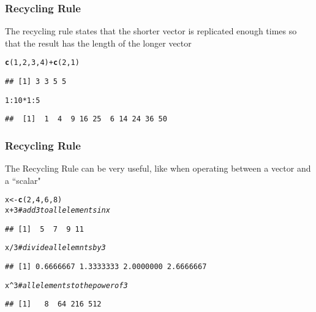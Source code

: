 \documentclass[12pt]{beamer}\usepackage[]{graphicx}\usepackage[]{color}
\makeatletter
\newcommand{\hlnum}[1]{\textcolor[rgb]{0.686,0.059,0.569}{#1}}%
\newcommand{\hlcom}[1]{\textcolor[rgb]{0.678,0.584,0.686}{\textit{#1}}}%
\newcommand{\hlopt}[1]{\textcolor[rgb]{0,0,0}{#1}}%
\newcommand{\hlstd}[1]{\textcolor[rgb]{0.345,0.345,0.345}{#1}}%
\newcommand{\hlkwb}[1]{\textcolor[rgb]{0.69,0.353,0.396}{#1}}%
\newcommand{\hlkwd}[1]{\textcolor[rgb]{0.737,0.353,0.396}{\textbf{#1}}}%
\newenvironment{kframe}{%
 \def\at@end@of@kframe{}%
 \ifinner\ifhmode%
  \def\at@end@of@kframe{\end{minipage}}%
  \begin{minipage}{\columnwidth}%
 \fi\fi%
 \def\FrameCommand##1{\hskip\@totalleftmargin \hskip-\fboxsep
 \colorbox{shadecolor}{##1}\hskip-\fboxsep
     \hskip-\linewidth \hskip-\@totalleftmargin \hskip\columnwidth}%
 \MakeFramed {\advance\hsize-\width
   \@totalleftmargin\z@ \linewidth\hsize
   \@setminipage}}%
 {\par\unskip\endMakeFramed%
 \at@end@of@kframe}
\newenvironment{knitrout}{}{} %
\makeatother
\begin{document}

\begin{frame}[fragile]
\frametitle{Recycling Rule}

The recycling rule states that the shorter vector is replicated enough times so that the result has the length of the longer vector
\begin{knitrout}\footnotesize
{}\color{fgcolor}\begin{kframe}
\begin{alltt}
\hlkwd{c}\hlstd{(}\hlnum{1}\hlstd{,} \hlnum{2}\hlstd{,} \hlnum{3}\hlstd{,} \hlnum{4}\hlstd{)} \hlopt{+} \hlkwd{c}\hlstd{(}\hlnum{2}\hlstd{,} \hlnum{1}\hlstd{)}
\end{alltt}
\begin{verbatim}
## [1] 3 3 5 5
\end{verbatim}
\begin{alltt}
\hlnum{1}\hlopt{:}\hlnum{10} \hlopt{*} \hlnum{1}\hlopt{:}\hlnum{5}
\end{alltt}
\begin{verbatim}
##  [1]  1  4  9 16 25  6 14 24 36 50
\end{verbatim}
\end{kframe}
\end{knitrout}

\end{frame}


\begin{frame}[fragile]
\frametitle{Recycling Rule}

The Recycling Rule can be very useful, like when operating between a vector and a ``scalar"
\begin{knitrout}\footnotesize
{}\color{fgcolor}\begin{kframe}
\begin{alltt}
\hlstd{x} \hlkwb{<-} \hlkwd{c}\hlstd{(}\hlnum{2}\hlstd{,} \hlnum{4}\hlstd{,} \hlnum{6}\hlstd{,} \hlnum{8}\hlstd{)}
\hlstd{x} \hlopt{+} \hlnum{3}  \hlcom{# add 3 to all elements in x}
\end{alltt}
\begin{verbatim}
## [1]  5  7  9 11
\end{verbatim}
\begin{alltt}
\hlstd{x} \hlopt{/} \hlnum{3}  \hlcom{# divide all elemnts by 3}
\end{alltt}
\begin{verbatim}
## [1] 0.6666667 1.3333333 2.0000000 2.6666667
\end{verbatim}
\begin{alltt}
\hlstd{x} \hlopt{^} \hlnum{3}  \hlcom{# all elements to the power of 3}
\end{alltt}
\begin{verbatim}
## [1]   8  64 216 512
\end{verbatim}
\end{kframe}
\end{knitrout}

\end{frame}
\end{document}

